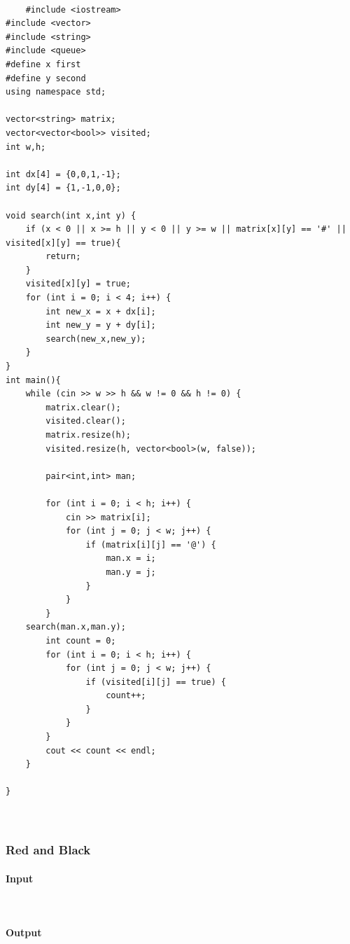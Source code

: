 \documentclass{article}
\begin{document}
\begin{lstlisting}

	#include <iostream>
#include <vector>
#include <string>
#include <queue>
#define x first
#define y second
using namespace std;

vector<string> matrix;
vector<vector<bool>> visited;
int w,h;

int dx[4] = {0,0,1,-1};
int dy[4] = {1,-1,0,0};

void search(int x,int y) {
    if (x < 0 || x >= h || y < 0 || y >= w || matrix[x][y] == '#' || visited[x][y] == true){
        return;
    }
    visited[x][y] = true;
    for (int i = 0; i < 4; i++) {
        int new_x = x + dx[i];
        int new_y = y + dy[i];
        search(new_x,new_y);
    }
}
int main(){
    while (cin >> w >> h && w != 0 && h != 0) {
        matrix.clear();
        visited.clear();
        matrix.resize(h);
        visited.resize(h, vector<bool>(w, false));

        pair<int,int> man;

        for (int i = 0; i < h; i++) {
            cin >> matrix[i];
            for (int j = 0; j < w; j++) {
                if (matrix[i][j] == '@') {
                    man.x = i;
                    man.y = j;
                }
            }
        }
    search(man.x,man.y);
        int count = 0;
        for (int i = 0; i < h; i++) {
            for (int j = 0; j < w; j++) {
                if (visited[i][j] == true) {
                    count++;
                }
            }
        }
        cout << count << endl;
    }

}

	
\end{lstlisting}

\subsubsection{Red and Black}
 

\paragraph{Input} \mbox{} \\



\paragraph{Output}\mbox{} \\
\end{document}
